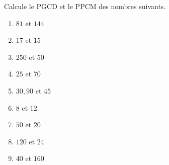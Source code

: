 %
%
  Calcule le PGCD et le PPCM des nombres suivants.
  \begin{enumerate}[cols=3]
    \item $81$ et $144$
    \item $17$ et $15$
    \item $250$ et $50$
    \item $25$ et $70$
    \item $30,90$ et $45$
    \item $8$ et $12$
    \item $50$ et $20$
    \item $120$ et $24$
    \item $40$ et $160$
  \end{enumerate}
